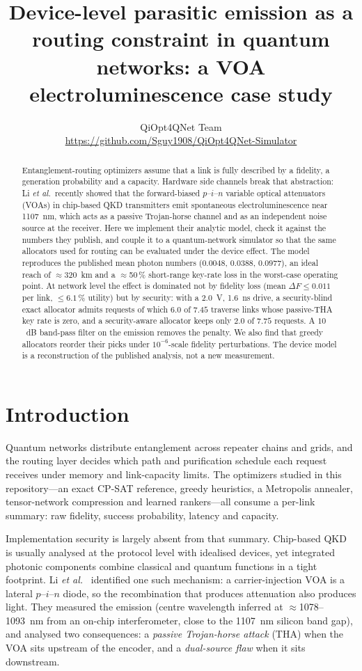 \documentclass[10pt]{article}
\title{\textbf{Device-level parasitic emission as a routing constraint in
quantum networks: a VOA electroluminescence case study}}
\author{QiOpt4QNet Team\\
{\small\url{https://github.com/Sguy1908/QiOpt4QNet-Simulator}}}
\date{}
\begin{document}
\maketitle

\begin{abstract}
\noindent Entanglement-routing optimizers assume that a link is fully described by
a fidelity, a generation probability and a capacity. Hardware side channels
break that abstraction: Li \emph{et al.}\ recently showed that the forward-biased
$p$--$i$--$n$ variable optical attenuators (VOAs) in chip-based QKD transmitters
emit spontaneous electroluminescence near 1107~nm, which acts as a passive
Trojan-horse channel and as an independent noise source at the receiver.
Here we implement their analytic model, check it against the numbers they
publish, and couple it to a quantum-network simulator so that the same
allocators used for routing can be evaluated under the device effect. The
model reproduces the published mean photon numbers ($0.0048$, $0.0388$,
$0.0977$), an ideal reach of $\approx$320~km and a $\approx$50\,\% short-range
key-rate loss in the worst-case operating point. At network level the effect is
dominated not by fidelity loss (mean $\Delta F\le 0.011$ per link, $\le 6.1\,\%$
utility) but by security: with a 2.0~V, 1.6~ns drive, a security-blind exact
allocator admits requests of which $6.0$ of $7.45$ traverse links whose
passive-THA key rate is zero, and a security-aware allocator keeps only $2.0$ of
$7.75$ requests. A $10$~dB band-pass filter on the emission removes the
penalty. We also find that greedy allocators reorder their picks under
$10^{-6}$-scale fidelity perturbations. The device model is a reconstruction of
the published analysis, not a new measurement.
\end{abstract}

\section{Introduction}
Quantum networks distribute entanglement across repeater chains and grids, and
the routing layer decides which path and purification schedule each request
receives under memory and link-capacity limits. The optimizers studied in this
repository---an exact CP-SAT reference, greedy heuristics, a Metropolis
annealer, tensor-network compression and learned rankers---all consume a
per-link summary: raw fidelity, success probability, latency and capacity.

Implementation security is largely absent from that summary. Chip-based QKD is
usually analysed at the protocol level with idealised devices, yet integrated
photonic components combine classical and quantum functions in a tight
footprint. Li \emph{et al.}~\cite{li2026voa} identified one such mechanism: a
carrier-injection VOA is a lateral $p$--$i$--$n$ diode, so the recombination
that produces attenuation also produces light. They measured the emission
(centre wavelength inferred at $\approx$1078--1093~nm from an on-chip
interferometer, close to the 1107~nm silicon band gap), and analysed two
consequences: a \emph{passive Trojan-horse attack} (THA) when the VOA sits
upstream of the encoder, and a \emph{dual-source flaw} when it sits
downstream.
\end{document}
